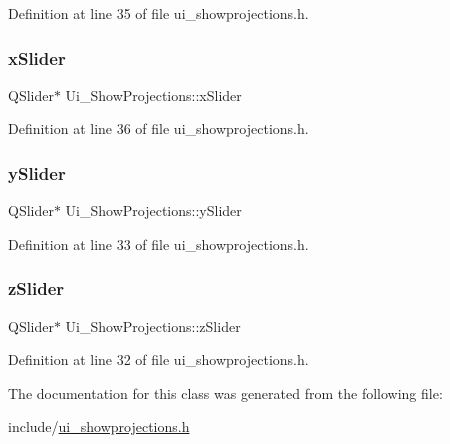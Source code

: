 Definition at line 35 of file ui\+\_\+showprojections.\+h.

\mbox{\label{class_ui___show_projections_a73c91a390071d9bb5192d57ec437900e}} 
\subsubsection{\texorpdfstring{x\+Slider}{xSlider}}
{\footnotesize\ttfamily Q\+Slider$\ast$ Ui\+\_\+\+Show\+Projections\+::x\+Slider}



Definition at line 36 of file ui\+\_\+showprojections.\+h.

\mbox{\label{class_ui___show_projections_aa25759b69798fc85b83617f8b614eefe}} 
\subsubsection{\texorpdfstring{y\+Slider}{ySlider}}
{\footnotesize\ttfamily Q\+Slider$\ast$ Ui\+\_\+\+Show\+Projections\+::y\+Slider}



Definition at line 33 of file ui\+\_\+showprojections.\+h.

\mbox{\label{class_ui___show_projections_a93249521ba2f7bd85762769534710801}} 
\subsubsection{\texorpdfstring{z\+Slider}{zSlider}}
{\footnotesize\ttfamily Q\+Slider$\ast$ Ui\+\_\+\+Show\+Projections\+::z\+Slider}



Definition at line 32 of file ui\+\_\+showprojections.\+h.



The documentation for this class was generated from the following file\+:\begin{DoxyCompactItemize}
\item 
include/\mbox{\hyperlink{ui__showprojections_8h}{ui\+\_\+showprojections.\+h}}\end{DoxyCompactItemize}
